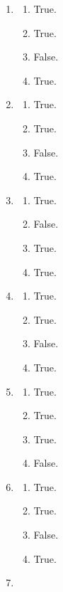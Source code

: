 \documentclass[12pt,a4paper]{article}
\begin{document}
\begin{enumerate}
\begin{enumerate}[label=(\Alph*)]
  \end{enumerate}
  \item \begin{enumerate}[label=(\Alph*)]
    \item True.
    \item True.
    \item False.
    \item True.
  \end{enumerate}
  \item \begin{enumerate}[label=(\Alph*)]
    \item True.
    \item True.
    \item False.
    \item True.
  \end{enumerate}
  \item \begin{enumerate}[label=(\Alph*)]
    \item True.
    \item False.
    \item True.
    \item True.
  \end{enumerate}
  \item \begin{enumerate}[label=(\Alph*)]
    \item True.
    \item True.
    \item False.
    \item True.
  \end{enumerate}
  \item \begin{enumerate}[label=(\Alph*)]
    \item True.
    \item True.
    \item True.
    \item False.
  \end{enumerate}
  \item \begin{enumerate}[label=(\Alph*)]
    \item True.
    \item True.
    \item False.
    \item True.
  \end{enumerate}
  \item \begin{enumerate}[label=(\Alph*)]

\end{enumerate}
\end{enumerate}
\end{document}
